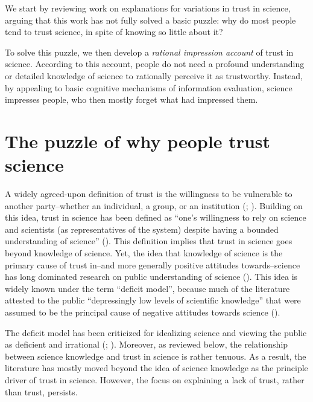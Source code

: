 \documentclass[
  jou,
  floatsintext,
  longtable,
  nolmodern,
  notxfonts,
  notimes,
  colorlinks=true,linkcolor=blue,citecolor=blue,urlcolor=blue]{apa7}
\begin{document}
We start by reviewing work on explanations for variations in trust in
science, arguing that this work has not fully solved a basic puzzle: why
do most people tend to trust science, in spite of knowing so little
about it?

To solve this puzzle, we then develop a \emph{rational impression
account} of trust in science. According to this account, people do not
need a profound understanding or detailed knowledge of science to
rationally perceive it as trustworthy. Instead, by appealing to basic
cognitive mechanisms of information evaluation, science impresses
people, who then mostly forget what had impressed them.

\section{The puzzle of why people trust
science}\label{the-puzzle-of-why-people-trust-science}

A widely agreed-upon definition of trust is the willingness to be
vulnerable to another party--whether an individual, a group, or an
institution
(; ). Building on this idea, trust in science has been defined as
``one's willingness to rely on science and scientists (as
representatives of the system) despite having a bounded understanding of
science'' (). This definition implies that trust in science goes
beyond knowledge of science. Yet, the idea that knowledge of science is
the primary cause of trust in--and more generally positive attitudes
towards--science has long dominated research on public understanding of
science (). This
idea is widely known under the term ``deficit model'', because much of
the literature attested to the public ``depressingly low levels of
scientific knowledge'' that were assumed to be the principal cause of
negative attitudes towards science
().

The deficit model has been criticized for idealizing science and viewing
the public as deficient and irrational
(;
).
Moreover, as reviewed below, the relationship between science knowledge
and trust in science is rather tenuous. As a result, the literature has
mostly moved beyond the idea of science knowledge as the principle
driver of trust in science. However, the focus on explaining a lack of
trust, rather than trust, persists.
\end{document}
